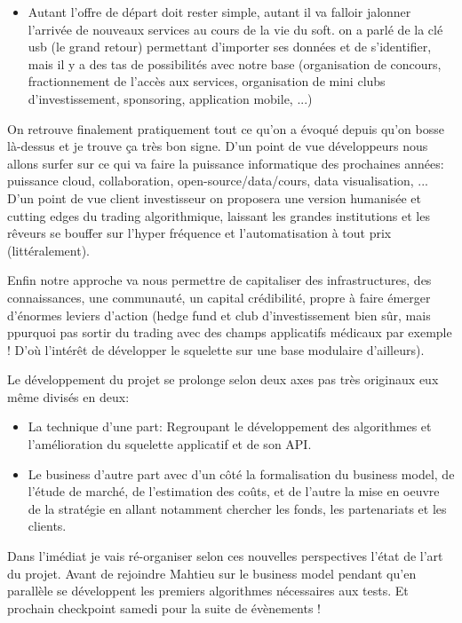 \begin{itemize}
    \item Autant l'offre de départ doit rester simple, autant il va falloir
    jalonner l'arrivée de nouveaux services au cours de la vie du soft. on a
    parlé de la clé usb (le grand retour) permettant d'importer ses données et de s'identifier,
    mais il y a des tas de possibilités avec notre base (organisation de
    concours, fractionnement de l'accès aux services, organisation de mini
    clubs d'investissement, sponsoring, application mobile, ...)\newline

\end{itemize}

On retrouve finalement pratiquement tout ce qu'on a évoqué depuis qu'on bosse
là-dessus et je trouve ça très bon signe. D'un point de vue développeurs nous
allons surfer sur ce qui va faire la puissance informatique des prochaines
années: puissance cloud, collaboration, open-source/data/cours, data
visualisation, ... D'un point de vue client investisseur on proposera une
version humanisée et cutting edges du trading algorithmique, laissant les
grandes institutions et les rêveurs se bouffer sur l'hyper fréquence et l'automatisation à
tout prix (littéralement).\newline

Enfin notre approche va nous permettre de capitaliser des infrastructures, des
connaissances, une communauté, un capital crédibilité, propre à faire émerger
d'énormes leviers d'action (hedge fund et club d'investissement bien sûr, mais
ppurquoi pas sortir du trading avec des champs applicatifs médicaux par exemple
! D'où l'intérêt de développer le squelette sur une base modulaire
d'ailleurs).\newline
\newline

\newpage

Le développement du projet se prolonge selon deux axes pas très originaux eux même divisés en
deux: \newline

\begin{itemize}

    \item La technique d'une part: Regroupant le développement des algorithmes et
l'amélioration du squelette applicatif et de son API. \newline

    \item Le business d'autre part avec d'un côté la formalisation du business model, de l'étude de
marché, de l'estimation des coûts, et de l'autre la mise en oeuvre de la
stratégie en allant notamment chercher les fonds, les partenariats et les
clients.\newline

\end{itemize}


Dans l'imédiat je vais ré-organiser selon ces nouvelles perspectives l'état de
l'art du projet. Avant de rejoindre Mahtieu sur le business model pendant qu'en
parallèle se développent les premiers algorithmes nécessaires aux tests. Et
prochain checkpoint samedi pour la suite de évènements !

